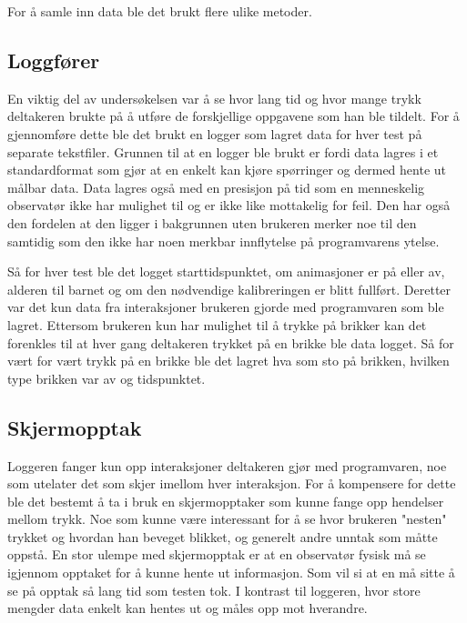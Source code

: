  
For å samle inn data ble det brukt flere ulike metoder.  
 
 
\subsection{Loggfører} 

En viktig del av undersøkelsen var å se hvor lang tid og hvor mange trykk deltakeren brukte på å utføre de forskjellige oppgavene som han ble tildelt. For å gjennomføre dette ble det brukt en logger som lagret data for hver test på separate tekstfiler. Grunnen til at en logger ble brukt er fordi data lagres i et standardformat som gjør at en enkelt kan kjøre spørringer og dermed hente ut målbar data. Data lagres også med en presisjon på tid som en menneskelig observatør ikke har mulighet til og er ikke like mottakelig for feil. Den har også den fordelen at den ligger i bakgrunnen uten brukeren merker noe til den samtidig som den ikke har noen merkbar innflytelse på programvarens ytelse. 
 
 
Så for hver test ble det logget starttidspunktet, om animasjoner er på eller av, alderen til barnet og om den nødvendige kalibreringen er blitt fullført. Deretter var det kun data fra interaksjoner brukeren gjorde med programvaren som ble lagret. Ettersom brukeren kun har mulighet til å trykke på brikker kan det forenkles til at hver gang deltakeren trykket på en brikke ble data logget. Så for vært for vært trykk på en brikke ble det lagret hva som sto på brikken, hvilken type brikken var av og tidspunktet. 
 
 
 
 
\subsection{Skjermopptak} 
 
Loggeren fanger kun opp interaksjoner deltakeren gjør med programvaren, noe som utelater det som skjer imellom hver interaksjon. For å kompensere for dette ble det bestemt å ta i bruk en skjermopptaker som kunne fange opp hendelser mellom trykk. Noe som kunne være interessant for å se hvor brukeren "nesten" trykket og hvordan han beveget blikket, og generelt andre unntak som måtte oppstå. En stor ulempe med skjermopptak er at en observatør fysisk må se igjennom opptaket for å kunne hente ut informasjon. Som vil si at en må sitte å se på opptak så lang tid som testen tok. I kontrast til loggeren, hvor store mengder data enkelt kan hentes ut og måles opp mot hverandre. 
 
